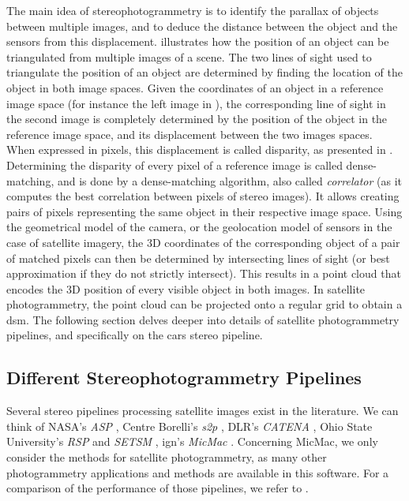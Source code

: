 The main idea of stereophotogrammetry is to identify the parallax of objects between multiple images, and to deduce the distance between the object and the sensors from this displacement.  illustrates how the position of an object can be triangulated from multiple images of a scene. The two lines of sight used to triangulate the position of an object are determined by finding the location of the object in both image spaces. Given the coordinates of an object in a reference image space (for instance the left image in ), the corresponding line of sight in the second image is completely determined by the position of the object in the reference image space, and its displacement between the two images spaces. When expressed in pixels, this displacement is called disparity, as presented in . Determining the disparity of every pixel of a reference image is called dense-matching, and is done by a dense-matching algorithm, also called \textit{correlator} (as it computes the best correlation between pixels of stereo images). It allows creating pairs of pixels representing the same object in their respective image space. Using the geometrical model of the camera, or the geolocation model of sensors in the case of satellite imagery, the 3D coordinates of the corresponding object of a pair of matched pixels can then be determined by intersecting lines of sight (or best approximation if they do not strictly intersect). This results in a point cloud that encodes the 3D position of every visible object in both images. In satellite photogrammetry, the point cloud can be projected onto a regular grid to obtain a \acrshort{dsm}. The following section delves deeper into details of satellite photogrammetry pipelines, and specifically on the \acrshort{cars} stereo pipeline.

\subsection{Different Stereophotogrammetry Pipelines}\label{sec:different_photogrammetry_pipelines}
Several stereo pipelines processing satellite images exist in the literature. We can think of NASA's \textit{ASP} \cite{shean_automated_2016}, Centre Borelli's \textit{s2p} \cite{franchis_automatic_2014}, DLR's \textit{CATENA} \cite{kraus_fully_2013}, Ohio State University's \textit{RSP} and \textit{SETSM} \cite{qin_rpc_2016, noh_surface_2017}, \acrshort{ign}'s \textit{MicMac} \cite{rupnik_micmac_2017}. Concerning MicMac, we only consider the methods for satellite photogrammetry, as many other photogrammetry applications and methods are available in this software. For a comparison of the performance of those pipelines, we refer to \cite{haala_dense_2014,bosch_metric_2017,qin_quality_2021}.

